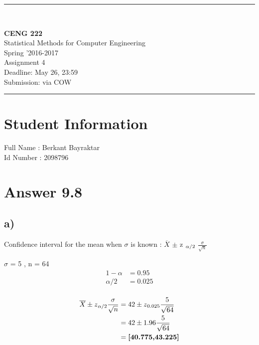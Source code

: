 \documentclass[12pt]{article}
\newcommand{\HRule}{\rule{\linewidth}{1mm}}
\begin{document}
\noindent
\HRule \\[3mm]
\begin{flushright}

                                         \LARGE \textbf{CENG 222}  \\[4mm]
                                         \Large Statistical Methods for Computer Engineering \\[4mm]
                                        \normalsize      Spring '2016-2017 \\
                                           \Large   Assignment 4 \\
                    \normalsize Deadline: May 26, 23:59 \\
                    \normalsize Submission: via COW
\end{flushright}
\HRule

\section*{Student Information }
Full Name : Berkant Bayraktar \\
Id Number : 2098796 \\

\section*{Answer 9.8}
\subsection*{a)}
Confidence interval for the mean when $\sigma$ is known : $\overline{X}$ $\pm$ z $\textsubscript{$\alpha / 2$}$ $\frac{\sigma}{\sqrt{n}}$ \\

\begin{center}
$\sigma$ = 5 , n = 64 \\

\begin{align*}
1 - \alpha &= 0.95 \\
\alpha / 2 &=0.025 \\
\end{align*}

\begin{align*}
\overline{X} \pm z\textsubscript{$\alpha$/2}\frac{\sigma}{\sqrt{n}}&=42 \pm z \textsubscript{0.025} \frac{5}{\sqrt{64}}\\
&=42 \pm 1.96 \frac{5}{\sqrt{64}}\\
&=\textbf{[40.775,43.225]} \\
\end{align*}
\end{center}
\end{document}
